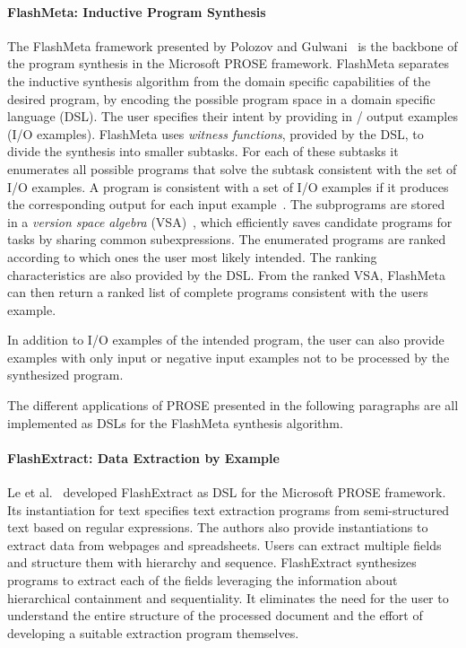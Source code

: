 \documentclass[\myrootdir/main.tex]{subfiles}
\begin{document}
\paragraph{FlashMeta: Inductive Program Synthesis}
The FlashMeta framework presented by Polozov and Gulwani~\cite{polozov2015flashmeta:} is the backbone of the program synthesis in the Microsoft PROSE framework.
FlashMeta separates the inductive synthesis algorithm from the domain specific capabilities of the desired program, by encoding the possible program space in a domain specific language (DSL).
The user specifies their intent by providing in / output examples (I/O examples).
FlashMeta uses \emph{witness functions}, provided by the DSL, to divide the synthesis into smaller subtasks.
For each of these subtasks it enumerates all possible programs that solve the subtask consistent with the set of I/O examples.
A program is consistent with a set of I/O examples if it produces the corresponding output for each input example~\cite{mitchell1982generalization}.
The subprograms are stored in a \emph{version space algebra} (VSA)~\cite{mitchell1982generalization}, which efficiently saves candidate programs for tasks by sharing common subexpressions.
The enumerated programs are ranked according to which ones the user most likely intended.
The ranking characteristics are also provided by the DSL.
From the ranked VSA, FlashMeta can then return a ranked list of complete programs consistent with the users example.

In addition to I/O examples of the intended program, the user can also provide examples with only input or negative input examples not to be processed by the synthesized program.

The different applications of PROSE presented in the following paragraphs are all implemented as DSLs for the FlashMeta synthesis algorithm.

\paragraph{FlashExtract: Data Extraction by Example}
Le et al.~\cite{le2014flashextract:} developed FlashExtract as DSL for the Microsoft PROSE framework.
Its instantiation for text specifies text extraction programs from semi-structured text based on regular expressions.
The authors also provide instantiations to extract data from webpages and spreadsheets.
Users can extract multiple fields and structure them with hierarchy and sequence.
FlashExtract synthesizes programs to extract each of the fields leveraging the information about hierarchical containment and sequentiality.
It eliminates the need for the user to understand the entire structure of the processed document and the effort of developing a suitable extraction program themselves.
\end{document}
